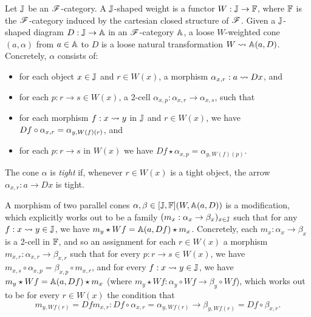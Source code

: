 \documentclass[../thesis.tex]{subfiles}
\begin{document}
\begin{definition}
  Let ${\mathbb{J}}$ be an ${\mathscr{F}}$-category. A ${\mathbb{J}}$-shaped weight is a functor $W : {\mathbb{J}} \to {\mathbb{F}}$, where ${\mathbb{F}}$
  is the ${\mathscr{F}}$-category induced by the cartesian closed structure of ${\mathscr{F}}$. Given a ${\mathbb{J}}$-shaped
  diagram $D : {\mathbb{J}} \to {\mathbb{A}}$ in an ${\mathscr{F}}$-category ${\mathbb{A}}$, a loose $W$-weighted cone $(a,\alpha)$
  from $a \in {\mathbb{A}}$ to $D$ is a loose natural transformation $W \rightsquigarrow {\mathbb{A}}(a,D)$. Concretely,
  $\alpha$ consists of:
  \begin{itemize}
    \item for each object $x \in {\mathbb{J}}$ and $r \in W(x)$, a morphism $\alpha_{x,r} : a \rightsquigarrow Dx$,
      and
    \item for each $p : r \to s \in W(x)$, a 2-cell $\alpha_{x,p} : \alpha_{x,r} \to \alpha_{x,s}$,
      such that
    \item for each morphism $f : x \rightsquigarrow y$ in ${\mathbb{J}}$ and $r \in W(x)$, we have $Df \circ \alpha_%
      {x,r} = \alpha_{y,W(f)(r)}$, and
    \item for each $p : r \to s$ in $W(x)$ we have $Df \star \alpha_{x,p} = \alpha_{y,W(f)(p)}$.
  \end{itemize} 
  The cone $\alpha$ is \emph{tight} if, whenever $r \in W(x)$ is a tight object, the arrow
  $\alpha_{x,r} : a \to Dx$ is tight.

  A morphism of two parallel cones $\alpha,\beta \in [{\mathbb{J}},{\mathbb{F}}](W,{\mathbb{A}}(a,D))$ is a modification,
  which explicitly works out to be a family $(m_x : \alpha_x \to \beta_x)_{x \in {\mathbb{J}}}$ such
  that for any $f : x \rightsquigarrow y \in {\mathbb{J}}$, we have $m_y \star Wf = {\mathbb{A}}(a,Df) \star m_x$. Concretely,
  each $m_x : \alpha_x \to \beta_x$ is a 2-cell in ${\mathbb{F}}$, and so an assignment for each
  $r \in W(x)$ a morphism $m_{x,r} : \alpha_{x,r} \to \beta_{x,r}$ such that for every $p :
  r \to s \in W(x)$, we have $m_{x,s} \circ \alpha_{x,p} = \beta_{x,p} \circ m_{x,r}$,
  and for every $f : x \rightsquigarrow y \in {\mathbb{J}}$, we have $m_y \star Wf = {\mathbb{A}}(a,Df) \star m_x$
  (where $m_y \star Wf : \alpha_y \circ Wf \to \beta_y \circ Wf$), which
  works out to be for every $r \in W(x)$ the condition that
  \[m_{y,Wf(r)} = Df m_{x,r} : Df \circ \alpha_{x,r} = \alpha_{y,Wf(r)} \to \beta_{y,Wf(r)}
  = Df \circ \beta_{x,r}.\]
\end{definition}
\end{document}
